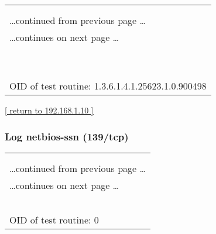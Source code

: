 \documentclass{article}
\begin{document}
\begin{longtable}{|p{}|}
\hline
\rowcolor{openvas_log}{\color{white}{Log (CVSS: 0.0) }}\\
\rowcolor{openvas_log}{\color{white}{NVT: Apache Web ServerVersion Detection}}\\
\hline
\endfirsthead
\hfill\ldots continued from previous page \ldots \\
\hline
\endhead
\hline
\ldots continues on next page \ldots \\
\endfoot
\hline
\endlastfoot
\\
\rowcolor{white}{\verb=Detected Apache version: 2.2.14=}\\
\rowcolor{white}{\verb=Location: 80/tcp=}\\
\rowcolor{white}{\verb=CPE: cpe:/a:apache:http_server:2.2.14=}\\
\rowcolor{white}{\verb=Concluded from version identification result:=}\\
\rowcolor{white}{\verb=Server: Apache/2.2.14=}\\
\rowcolor{white}{\verb==}\\
\rowcolor{white}{\verb==}\\
\\
OID of test routine: 1.3.6.1.4.1.25623.1.0.900498\\
\end{longtable}

\begin{footnotesize}\hyperref[host:192.168.1.10]{[ return to 192.168.1.10 ]}\end{footnotesize}
\subsubsection{Log netbios-ssn (139/tcp)}
\label{port:192.168.1.10 netbios-ssn (139/tcp) Log}

\begin{longtable}{|p{}|}
\hline
\rowcolor{openvas_log}{\color{white}{Log}}\\
\rowcolor{openvas_log}{\color{white}{NVT: }}\\
\hline
\endfirsthead
\hfill\ldots continued from previous page \ldots \\
\hline
\endhead
\hline
\ldots continues on next page \ldots \\
\endfoot
\hline
\endlastfoot
\\
\rowcolor{white}{\verb=Open port.=}\\
\rowcolor{white}{\verb==}\\
\rowcolor{white}{\verb==}\\
\\
OID of test routine: 0\\
\end{longtable}
\end{document}
